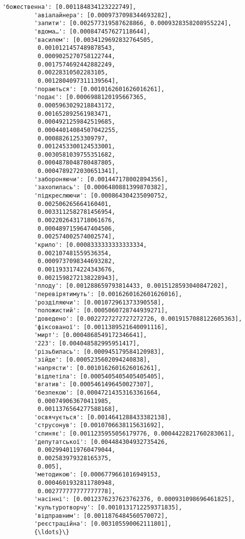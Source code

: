 \documentclass[11pt]{article}
\begin{document}
\begin{Verbatim}[commandchars=\\\{\}]
         'божественна': [0.001184834123222749],
         'авіалайнера': [0.0009737098344693282],
         'запити': [0.002577319587628866, 0.0009328358208955224],
         'вдома…': [0.000847457627118644],
         'василем': [0.0034129692832764505,
          0.0010121457489878543,
          0.0009025270758122744,
          0.0017574692442882249,
          0.00228310502283105,
          0.0012804097311139564],
         'пораються': [0.0010162601626016261],
         'подає': [0.0006988120195667365,
          0.0005963029218843172,
          0.001652892561983471,
          0.0004921259842519685,
          0.00044014084507042255,
          0.00088261253309797,
          0.0012453300124533001,
          0.0030581039755351682,
          0.0004878048780487805,
          0.0004789272030651341],
         'забороняючи': [0.001447178002894356],
         'захопилась': [0.0006480881399870382],
         'підкреслюючи': [0.000864304235090752,
          0.002506265664160401,
          0.0033112582781456954,
          0.0022026431718061676,
          0.0004897159647404506,
          0.002574002574002574],
         'крило': [0.0008333333333333334,
          0.002107481559536354,
          0.0009737098344693282,
          0.0011933174224343676,
          0.0021598272138228943],
         'плоду': [0.001288659793814433, 0.0015128593040847202],
         'перевірятимуть': [0.0016260162601626016],
         'розділяючи': [0.001072961373390558],
         'положистий': [0.0005060728744939271],
         'доведено': [0.0022727272727272726, 0.0019157088122605363],
         'фіксованої': [0.0011389521640091116],
         'мирт': [0.0004868549172346641],
         '223': [0.004048582995951417],
         'різьбилась': [0.000945179584120983],
         'зійде': [0.0005235602094240838],
         'напрясти': [0.0010162601626016261],
         'відлетіла': [0.0005405405405405405],
         'вгатив': [0.0005461496450027307],
         'безпекою': [0.00047214353163361664,
          0.000749063670411985,
          0.0011376564277588168],
         'освячується': [0.0014641288433382138],
         'струсонув': [0.0010706638115631692],
         'спиняє': [0.0011235955056179776, 0.0004422821760283061],
         'депутатської': [0.004484304932735426,
          0.0029940119760479044,
          0.002583979328165375,
          0.005],
         'методикою': [0.0006779661016949153,
          0.0004601932811780948,
          0.002777777777777778],
         'насінні': [0.0012376237623762376, 0.000931098696461825],
         'культуротворчу': [0.0010131712259371835],
         'відправним': [0.0011876484560570072],
         'реєстраційна': [0.003105590062111801],
         {\ldots}\}
\end{Verbatim}
            
\end{document}
